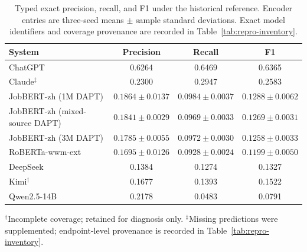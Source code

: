 \begin{table}[htbp]
\caption{Typed exact precision, recall, and F1 under the historical reference. Encoder entries are three-seed means $\pm$ sample standard deviations. Exact model identifiers and coverage provenance are recorded in Table~\ref{tab:repro-inventory}.}
\label{tab:pr-gold-v2}
\centering
\small
\begin{tabular}{lccc}
\toprule
\textbf{System} & \textbf{Precision} & \textbf{Recall} & \textbf{F1} \\
\midrule
ChatGPT & 0.6264 & 0.6469 & 0.6365 \\
Claude$^{\ddagger}$ & 0.2300 & 0.2947 & 0.2583 \\
JobBERT-zh (1M DAPT) & $0.1864\pm0.0137$ & $0.0984\pm0.0037$ & $0.1288\pm0.0062$ \\
JobBERT-zh (mixed-source DAPT) & $0.1841\pm0.0029$ & $0.0969\pm0.0033$ & $0.1269\pm0.0031$ \\
JobBERT-zh (3M DAPT) & $0.1785\pm0.0055$ & $0.0972\pm0.0030$ & $0.1258\pm0.0033$ \\
RoBERTa-wwm-ext & $0.1695\pm0.0126$ & $0.0928\pm0.0024$ & $0.1199\pm0.0050$ \\
DeepSeek & 0.1384 & 0.1274 & 0.1327 \\
Kimi$^{\dagger}$ & 0.1677 & 0.1393 & 0.1522 \\
Qwen2.5-14B & 0.2178 & 0.0483 & 0.0791 \\
\bottomrule
\end{tabular}
\vspace{0.3em}

\raggedright\footnotesize $^{\dagger}$Incomplete coverage; retained for diagnosis only. $^{\ddagger}$Missing predictions were supplemented; endpoint-level provenance is recorded in Table~\ref{tab:repro-inventory}.
\end{table}
